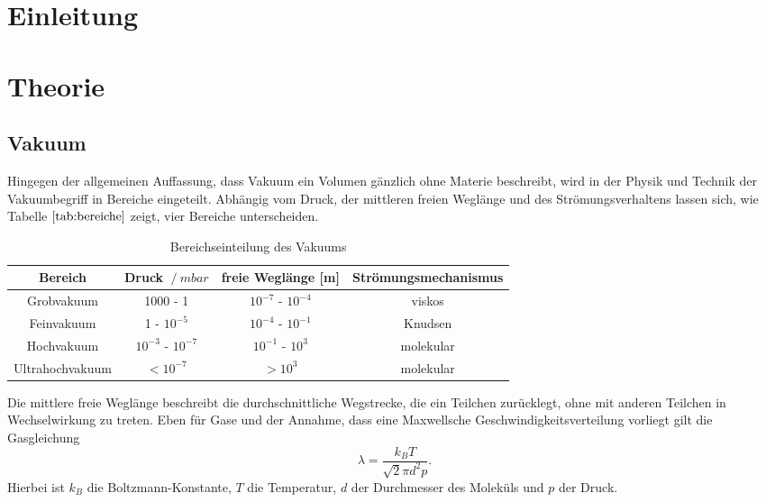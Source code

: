\section{Einleitung}

\section{Theorie}
\subsection{Vakuum}
Hingegen der allgemeinen Auffassung, dass Vakuum ein Volumen gänzlich ohne Materie beschreibt, wird in der Physik und Technik
der Vakuumbegriff in Bereiche eingeteilt.
Abhängig vom Druck, der mittleren freien Weglänge und des Strömungsverhaltens lassen sich, wie Tabelle $\ref{tab:bereiche}$ zeigt, vier Bereiche unterscheiden.

\begin{table}[!hht]
\begin{tabular}{c c c c}
 Bereich & Druck $\:/\: mbar$ & freie Weglänge [m] & Strömungsmechanismus \\
 \midrule
 Grobvakuum & 1000 - 1 & $10^{-7}$ - $10^{-4}$ & viskos \\
 Feinvakuum & 1 - $10^{-5}$ & $10^{-4}$ - $10^{-1}$ & Knudsen \\
 Hochvakuum & $10^{-3}$ - $10^{-7}$ & $10^{-1}$ - $10^3$ & molekular \\
 Ultrahochvakuum & $< 10^{-7}$ & $> 10^3$ & molekular \\
\end{tabular}
\caption{Bereichseinteilung des Vakuums}
\label{tab:bereiche}
\end{table}

Die mittlere freie Weglänge beschreibt die durchschnittliche Wegstrecke, die ein Teilchen zurücklegt, ohne mit anderen Teilchen in Wechselwirkung zu treten.
Eben für Gase und der Annahme, dass eine Maxwellsche Geschwindigkeitsverteilung vorliegt gilt die Gasgleichung
\begin{equation}
  \lambda = \frac{k_B T}{\sqrt{2}\pi d^2p}.
\end{equation}
Hierbei ist $k_B$ die Boltzmann-Konstante, $T$ die Temperatur, $d$ der Durchmesser des Moleküls und $p$ der Druck.
